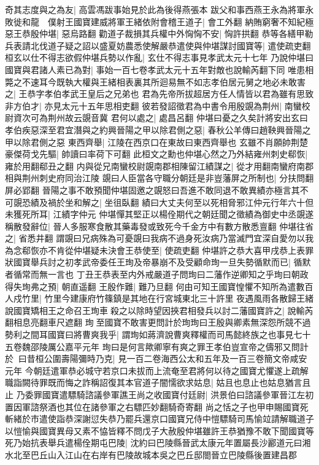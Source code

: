 奇其志度與之為友|{
	高雲馮跋事始見於此為後得燕張本}
跋父和事西燕王永為將軍永敗徙和龍　僕射王國寶建威將軍王緒依附會稽王道子|{
	會工外翻}
納賄窮奢不知紀極惡王恭殷仲堪|{
	惡烏路翻}
勸道子裁損其兵權中外恟恟不安|{
	恟許拱翻}
恭等各繕甲勒兵表請北伐道子疑之詔以盛夏妨農悉使解嚴恭遣使與仲堪謀討國寶等|{
	遣使疏吏翻}
桓玄以仕不得志欲假仲堪兵勢以作亂|{
	玄仕不得志事見孝武太元十七年}
乃說仲堪曰國寶與君諸人素已為對|{
	事始一百七卷孝武太元十五年對敵也說輸芮翻下同}
唯患相斃之不速耳今既執大權與王緒相表裏其所迴易無不如志孝伯居元舅之地必未敢害之|{
	王恭字孝伯孝武王皇后之兄弟也}
君為先帝所拔超居方任人情皆以君為雖有思致非方伯才|{
	亦見太元十五年思相吏翻}
彼若發詔徵君為中書令用殷覬為荆州|{
	南蠻校尉資次可為荆州故云覬音冀}
君何以處之|{
	處昌呂翻}
仲堪曰憂之久矣計將安出玄曰孝伯疾惡深至君宜潛與之約興晉陽之甲以除君側之惡|{
	春秋公羊傳曰趙鞅興晉陽之甲以除君側之惡}
東西齊舉|{
	江陵在西京口在東故曰東西齊舉也}
玄雖不肖願帥荆楚豪傑荷戈先驅|{
	帥讀曰率荷下可翻}
此桓文之勳也仲堪心然之乃外結雍州刺史郗恢|{
	雍於用翻郗丑之翻}
内與從兄南蠻校尉覬南郡相陳留江績謀之|{
	從才用翻南蠻府南郡相與荆州刺史府同治江陵}
覬曰人臣當各守職分朝廷是非豈藩屏之所制也|{
	分扶問翻屏必郢翻}
晉陽之事不敢預聞仲堪固邀之覬怒曰吾進不敢同退不敢異績亦極言其不可覬恐績及禍於坐和解之|{
	坐徂臥翻}
績曰大丈夫何至以死相脅邪江仲元行年六十但未獲死所耳|{
	江績字仲元}
仲堪憚其堅正以楊佺期代之朝廷聞之徵績為御史中丞覬遂稱散發辭位|{
	晉人多服寒食散其藥毒發或致死今千金方中有數方散悉亶翻}
仲堪往省之|{
	省悉井翻}
謂覬曰兄病殊為可憂覬曰我病不過身死汝病乃當滅門宜深自愛勿以我為念郗恢亦不肯從仲堪疑未決會王恭使至|{
	使疏吏翻}
仲堪許之恭大喜甲戌恭上表罪狀國寶舉兵討之初孝武帝委任王珣及帝暴崩不及受顧命珣一旦失勢循默而已|{
	循默者循常而無一言也}
丁丑王恭表至内外戒嚴道子問珣曰二藩作逆卿知之乎珣曰朝政得失珣弗之預|{
	朝直遥翻}
王殷作難|{
	難乃旦翻}
何由可知王國寶惶懼不知所為遣數百人戍竹里|{
	竹里今建康府竹篠鎮是其地在行宮城東北三十許里}
夜遇風雨各散歸王緒說國寶矯相王之命召王珣車殺之以除時望因挾君相發兵以討二藩國寶許之|{
	說輸芮翻相息亮翻車尺遮翻}
珣至國寶不敢害更問計於珣珣曰王殷與卿素無深怨所競不過勢利之間耳國寶曰將曹爽我乎|{
	謂珣如蔣濟說曹爽釋權而司馬懿終族之也事見七十五卷魏邵陵厲公嘉平元年}
珣曰是何言歟卿寧有爽之罪王孝伯豈宣帝之儔邪又問計於曰昔桓公圍壽陽彌時乃克|{
	見一百二卷海西公太和五年及一百三卷簡文帝咸安元年}
今朝廷遣軍恭必城守若京口未拔而上流奄至君將何以待之國寶尤懼遂上疏解職詣闕待罪既而悔之詐稱詔復其本官道子闇懦欲求姑息|{
	姑且也息止也姑息猶言且止}
乃委罪國寶遣驃騎諮議參軍譙王尚之收國寶付廷尉|{
	洪景伯曰諮議參軍晉江左初置因軍諮祭酒也其位在諸參軍之右驃匹妙翻騎奇寄翻}
尚之恬之子也甲申賜國寶死斬緒於市遣使詣恭深謝愆失恭乃罷兵還京口國寶兄侍中愷驃騎司馬愉竝請解職道子以愷愉與國寶異母又素不恊皆釋不問戊子大赦殷仲堪雖許王恭猶豫不敢下聞國寶等死乃始抗表舉兵遣楊佺期屯巴陵|{
	沈約曰巴陵縣晉武太康元年置屬長沙酈道元曰湘水北至巴丘山入江山在右岸有巴陵故城本吳之巴丘邸閤晉立巴陵縣後置建昌郡}
